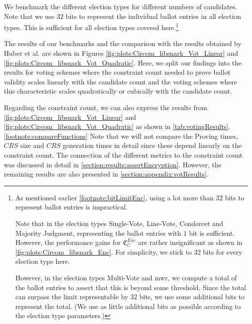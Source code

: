 We benchmark the different election types for different numbers of candidates.
Note that we use $32$ bits to represent the individual ballot entries in all election types.
This is sufficient for all election types covered here.\footnote{
    \label{footnote:bitLimitElectionTypes}
    As mentioned earlier \cref{footnote:bitLimitEnc}, using a lot more than $32$ bits to represent ballot entries is impractical.

    Note that in the election types Single-Vote, Line-Vote, Condorcet and Majority Judgment, representing the ballot entries with $1$ bit is sufficient.
    However, the performance gains for $\mathfrak{C}_C^{Enc}$ are rather insignificant as shown in \cref{fig:plots:Circom_libsnark_Enc}.
    For simplicity, we stick to $32$ bits for every election type here.

    However, in the election types Multi-Vote and \gls{mwr}, we compute a total of the ballot entries to assert that this is beyond some threshold. 
    Since the total can surpass the limit representable by $32$ bits, we use some additional bits to represent the total. 
    (We use as little additional bits as possible according to the election type parameters.)
}

The results of our benchmarks and the comparison with the results obtained by Huber et al. are shown in Figures \ref{fig:plots:Circom_libsnark_Vot_Linear} and \ref{fig:plots:Circom_libsnark_Vot_Quadratic}.
Here, we split our findings into the results for voting schemes where the constraint count needed to prove ballot validity scales linearly with the candidate count and the voting schemes where this characteristic scales quadratically or cubically with the candidate count.

Regarding the constraint count, we can also express the results from \cref{fig:plots:Circom_libsnark_Vot_Linear} and \cref{fig:plots:Circom_libsnark_Vot_Quadratic} as shown in \cref{tab:votingResults}.\cref{footnote:compareFunctions}
Note that we will not compare the Proving times, $CRS$ size and $CRS$ generation times in detail since these depend linearly on the constraint count.
The connection of the different metrics to the constraint count was discussed in detail in \cref{section:results:assertEncryption}.
However, the remaining results are also presented in \cref{section:appendix:votResults}.

